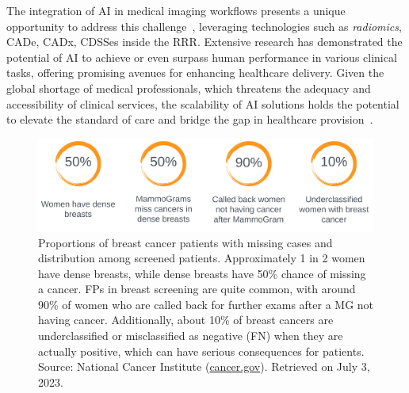 

The integration of \ac{AI} in medical imaging workflows presents a unique opportunity to address this challenge~\cite{McKinney2020}, leveraging technologies such as {\it radiomics}, \ac{CADe}, \ac{CADx}, \acp{CDSSe} inside the \ac{RRR}.
Extensive research has demonstrated the potential of \ac{AI} to achieve or even surpass human performance in various clinical tasks, offering promising avenues for enhancing healthcare delivery\cite{Topol2019}.
Given the global shortage of medical professionals, which threatens the adequacy and accessibility of clinical services, the scalability of \ac{AI} solutions holds the potential to elevate the standard of care and bridge the gap in healthcare provision~\cite{McKinney2020, Topol2019}.

\begin{figure}[ht]
\centering
\includegraphics[width=\textwidth]{images/fig114}
\caption{Proportions of breast cancer patients with missing cases and distribution among screened patients. Approximately 1 in 2 women have dense breasts, while dense breasts have 50\% chance of missing a cancer. FPs in breast screening are quite common, with around 90\% of women who are called back for further exams after a MG not having cancer. Additionally, about 10\% of breast cancers are underclassified or misclassified as negative (FN) when they are actually positive, which can have serious consequences for patients. Source: National Cancer Institute (\href{https://www.cancer.gov/types/breast/mammograms-fact-sheet}{cancer.gov}). Retrieved on July 3, 2023.}
\label{fig:fig114}
\end{figure}

